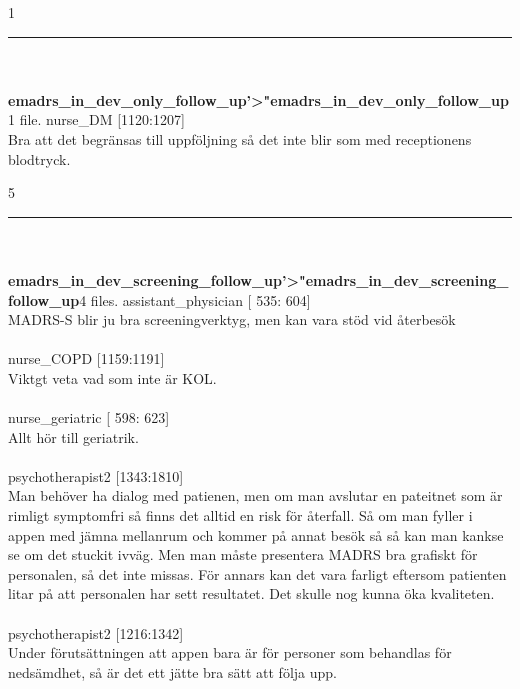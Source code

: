 \documentclass[12pt,a4paper,oneside]{article}
\begin{document}
1 
\hrule
\ \\\ \\{\bf emadrs\_in\_dev\_only\_follow\_up'>"emadrs\_in\_dev\_only\_follow\_up}1 file.
 nurse\_DM [1120:1207]\\ 
Bra att det begr{\"a}nsas till uppf{\"o}ljning s{\aa} det inte blir som med receptionens blodtryck. %

5 
\hrule
\ \\\ \\{\bf emadrs\_in\_dev\_screening\_follow\_up'>"emadrs\_in\_dev\_screening\_follow\_up}4 files.
 assistant\_physician [ 535: 604]\\ 
MADRS-S blir ju bra screeningverktyg, men kan vara st{\"o}d vid {\aa}terbes{\"o}k %
\ \\\ \\
 nurse\_COPD [1159:1191]\\ 
Viktgt veta vad som inte {\"a}r KOL. %
\ \\\ \\
 nurse\_geriatric [ 598: 623]\\ 
Allt h{\"o}r till geriatrik.  %
\ \\\ \\
 psychotherapist2 [1343:1810]\\ 
Man beh{\"o}ver ha dialog med patienen, men om man avslutar en pateitnet som {\"a}r rimligt symptomfri s{\aa} finns det alltid en risk f{\"o}r {\aa}terfall. S{\aa} om man fyller i appen med j{\"a}mna mellanrum och kommer p{\aa} annat bes{\"o}k s{\aa} s{\aa} kan man kankse se om det stuckit ivv{\"a}g. Men man m{\aa}ste presentera MADRS bra grafiskt f{\"o}r personalen, s{\aa} det inte missas. F{\"o}r annars kan det vara farligt eftersom patienten litar p{\aa} att personalen har sett resultatet. Det skulle nog kunna {\"o}ka kvaliteten.  %
\ \\\ \\
 psychotherapist2 [1216:1342]\\ 
Under f{\"o}ruts{\"a}ttningen att appen bara {\"a}r f{\"o}r personer som behandlas f{\"o}r neds{\"a}mdhet, s{\aa} {\"a}r det ett j{\"a}tte bra s{\"a}tt att f{\"o}lja upp. %
\end{document}
